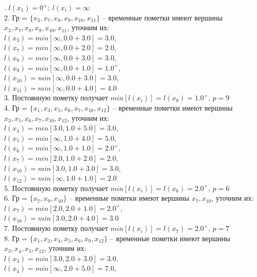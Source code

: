 \documentclass[a4paper,12pt]{article}
\begin{document}
. $l(x_1) = 0^+;\ l(x_i) = \infty$ \\
2. Гр = $\{x_{3}, x_{7}, x_{8}, x_{9}, x_{10}, x_{11}\}$ – временные пометки имеют вершины $x_{3}, x_{7}, x_{8}, x_{9}, x_{10}, x_{11}$, уточним их: \\
\indent $l(x_{3}) = min[\infty, 0.0 + 3.0] = 3.0$, \\
\indent $l(x_{7}) = min[\infty, 0.0 + 2.0] = 2.0$, \\
\indent $l(x_{8}) = min[\infty, 0.0 + 3.0] = 3.0$, \\
\indent $l(x_{9}) = min[\infty, 0.0 + 1.0] = 1.0^+$, \\
\indent $l(x_{10}) = min[\infty, 0.0 + 3.0] = 3.0$, \\
\indent $l(x_{11}) = min[\infty, 0.0 + 4.0] = 4.0$ \\
3. Постоянную пометку получает $min[l(x_i)] = l(x_{9}) = 1.0^+$, $p = 9$ \\
4. Гр = $\{x_{1}, x_{3}, x_{5}, x_{6}, x_{7}, x_{10}, x_{12}\}$ – временные пометки имеют вершины $x_{3}, x_{5}, x_{6}, x_{7}, x_{10}, x_{12}$, уточним их: \\
\indent $l(x_{3}) = min[3.0, 1.0 + 5.0] = 3.0$, \\
\indent $l(x_{5}) = min[\infty, 1.0 + 4.0] = 5.0$, \\ 
\indent $l(x_{6}) = min[\infty, 1.0 + 1.0] = 2.0^+$, \\
\indent $l(x_{7}) = min[2.0, 1.0 + 2.0] = 2.0$, \\
\indent $l(x_{10}) = min[3.0, 1.0 + 3.0] = 3.0$, \\
\indent $l(x_{12}) = min[\infty, 1.0 + 1.0] = 2.0$ \\
5. Постоянную пометку получает $min[l(x_i)] = l(x_{6}) = 2.0^+$, $p = 6$ \\
6. Гр = $\{x_{7}, x_{9}, x_{10}\}$ – временные пометки имеют вершины $x_{7}, x_{10}$, уточним их: \\
\indent $l(x_{7}) = min[2.0, 2.0 + 1.0] = 2.0^+$, \\
\indent $l(x_{10}) = min[3.0, 2.0 + 4.0] = 3.0$ \\
7. Постоянную пометку получает $min[l(x_i)] = l(x_{7}) = 2.0^+$, $p = 7$ \\
8. Гр = $\{x_{1}, x_{3}, x_{4}, x_{5}, x_{6}, x_{9}, x_{12}\}$ – временные пометки имеют вершины $x_{3}, x_{4}, x_{5}, x_{12}$, уточним их: \\
\indent $l(x_{3}) = min[3.0, 2.0 + 3.0] = 3.0$, \\
\indent $l(x_{4}) = min[\infty, 2.0 + 5.0] = 7.0$, \\
\end{document}
